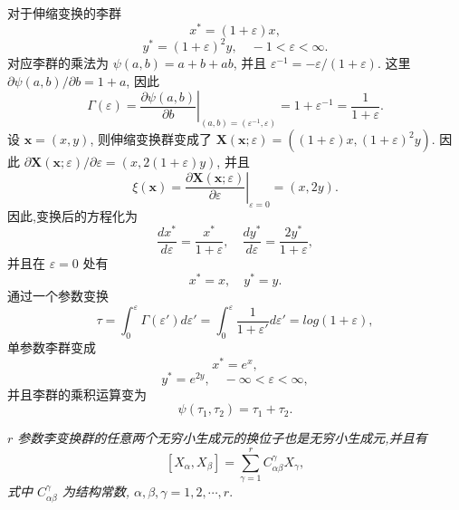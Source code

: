 对于伸缩变换的李群
\begin{equation*}
	x^*=(1+\varepsilon)x,
\end{equation*}
\begin{equation*}
	y^*=(1+\varepsilon)^2y,\quad -1<\varepsilon<\infty.
\end{equation*}
对应李群的乘法为 $\psi(a,b)=a+b+ab$, 并且 $\varepsilon^{-1}=-\varepsilon/(1+\varepsilon)$. 这里 $\partial \psi(a,b)/\partial b=1+a$, 因此
\begin{equation*}
	\Gamma(\varepsilon) = \left.\frac{\partial \psi(a,b)}{\partial b}\right|_{(a,b)=(\varepsilon^{-1},\varepsilon)}=1+\varepsilon^{-1}=\frac{1}{1+\varepsilon}.
\end{equation*}
设 $\mathbf{x}=(x,y)$, 则伸缩变换群变成了 $\mathbf{X}(\mathbf{x};\varepsilon)=((1+\varepsilon)x,(1+\varepsilon)^2y)$. 因此 $\partial \mathbf{X}(\mathbf{x};\varepsilon)/\partial \varepsilon=(x,2(1+\varepsilon)y)$, 并且
\begin{equation*}
	\xi(\mathbf{x})=\left.\frac{\partial \mathbf{X}(\mathbf{x};\varepsilon)}{\partial \varepsilon}\right|_{\varepsilon=0}=(x,2y).
\end{equation*}
因此,变换后的方程化为
\begin{equation*}
	\frac{dx^*}{d\varepsilon}=\frac{x^*}{1+\varepsilon},\quad \frac{dy^*}{d\varepsilon}=\frac{2y^*}{1+\varepsilon},
\end{equation*}
并且在 $\varepsilon=0$ 处有
\begin{equation*}
	x^*=x,\quad y^*=y.
\end{equation*}
通过一个参数变换
\begin{equation*}
	\tau=\int_{0}^{\varepsilon}\Gamma(\varepsilon ')d\varepsilon '=\int_{0}^{\varepsilon}\frac{1}{1+\varepsilon '}d\varepsilon ' = log(1+\varepsilon),
\end{equation*}
单参数李群变成
\begin{equation*}
	x^*=e^x,
\end{equation*}
\begin{equation*}
	y^*=e^{2y},\quad -\infty<\varepsilon<\infty,
\end{equation*}
并且李群的乘积运算变为
\begin{equation*}
	\psi(\tau_1,\tau_2)=\tau_1+\tau_2.
\end{equation*}

\begin{theorem}[李第二基本定理]
\emph{$r$ 参数李变换群的任意两个无穷小生成元的换位子也是无穷小生成元,并且有
\begin{equation}\label{eq:liec}
[X_\alpha,X_\beta] =\sum_{\gamma=1}^{r}C_{\alpha\beta}^{\gamma}X_{\gamma},
\end{equation}
式中 $C_{\alpha\beta}^{\gamma}$ 为结构常数, $\alpha,\beta,\gamma=1,2,\cdots,r.$}
\end{theorem}

